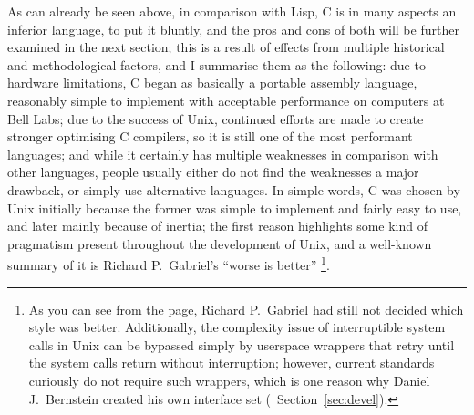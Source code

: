 As can already be seen above, in comparison with Lisp, C is in many aspects an
inferior language, to put it bluntly, and the pros and
cons of both will be further examined in the next section; this is a result of
effects from multiple historical and methodological factors, and I summarise
them as the following: due to hardware limitations, C began as basically a
portable assembly language, reasonably simple to implement with acceptable
performance on computers at Bell Labs; due to the success of Unix, continued
efforts are made to create stronger optimising C compilers, so it is still one
of the most performant languages; and while it certainly has multiple weaknesses
in comparison with other languages, people usually either do not find the
weaknesses a major drawback, or simply use alternative languages.  In simple
words, C was chosen by Unix initially because the former was simple to implement
and fairly easy to use, and later mainly because of inertia; the first reason
highlights some kind of pragmatism present throughout the development of Unix,
and a well-known summary of it is Richard P.\ Gabriel's ``worse is better''%
\footnote{As you can see from the page, Richard
P.\ Gabriel had still not decided which style was better.  Additionally,
the complexity issue of interruptible system calls in Unix can be bypassed
simply by userspace wrappers that retry until the system calls return without
interruption; however, current standards curiously do not require such
wrappers, which is one reason why Daniel J.\ Bernstein created
his own interface set (\cf~Section~\ref{sec:devel}).}.


